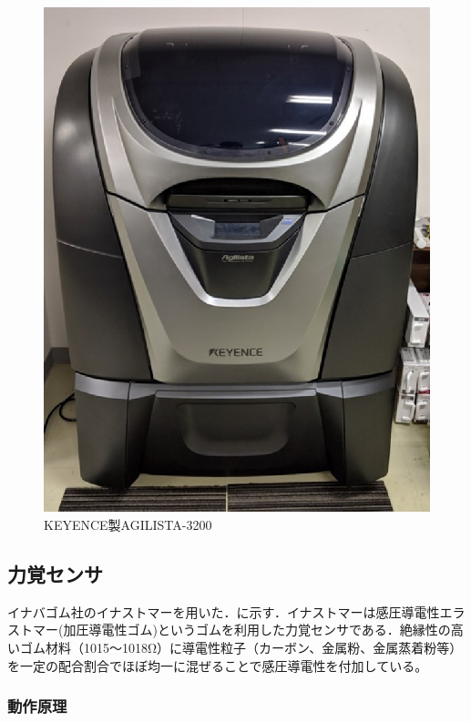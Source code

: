 \begin{figure}[b]
 \begin{center}
  \includegraphics[scale=0.4]{../fig/eps/agilista.eps}
 \caption{KEYENCE製AGILISTA-3200}
  \label{fig::agilista}
 \end{center}
\end{figure}


\subsection{力覚センサ}
イナバゴム社のイナストマーを用いた．に示す．イナストマーは感圧導電性エラストマー(加圧導電性ゴム)\cite{kanatsu}というゴムを利用した力覚センサである．絶縁性の高いゴム材料（1015～1018Ω）に導電性粒子（カーボン、金属粉、金属蒸着粉等）を一定の配合割合でほぼ均一に混ぜることで感圧導電性を付加している。

\subsubsection{動作原理}



\newpage

	
